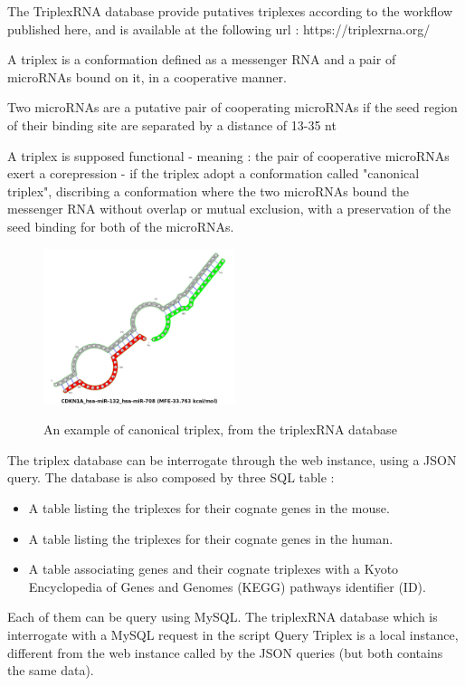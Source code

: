 \documentclass[a4paper,12pt]{report}
\begin{document}
The TriplexRNA database provide putatives triplexes according to the workflow published here\cite{triplex}, and is available at the following url : https://triplexrna.org/

A triplex is a conformation defined as a messenger RNA and a pair of microRNAs bound on it, in a cooperative manner. 

Two microRNAs are a putative pair of cooperating microRNAs if the seed region of their binding site are separated by a distance of 13-35 nt \cite{coop}

A triplex is supposed functional - meaning : the pair of cooperative microRNAs exert a corepression - if the triplex adopt a conformation called "canonical triplex", discribing a conformation where the two microRNAs bound the messenger RNA without overlap or mutual exclusion, with a preservation of the seed binding for both of the microRNAs.

\begin{figure}[H]
	\centering
	{\includegraphics[width=0.5\textwidth]{canonical.png}}
	\caption{An example of canonical triplex, from the triplexRNA database}
\end{figure}

The triplex database can be interrogate through the web instance, using a JSON query. The database is also composed by three SQL table :

\begin{itemize}
	\item A table listing the triplexes for their cognate genes in the mouse. 
	\item A table listing the triplexes for their cognate genes in the human.
	\item A table associating genes and their cognate triplexes with a Kyoto Encyclopedia of Genes and Genomes (KEGG) pathways identifier (ID)\cite{KEGG}.
\end{itemize}

Each of them can be query using MySQL.
The triplexRNA database which is interrogate with a MySQL request in the script Query Triplex is a local instance, different from the web instance called by the JSON queries (but both contains the same data).
\end{document}
